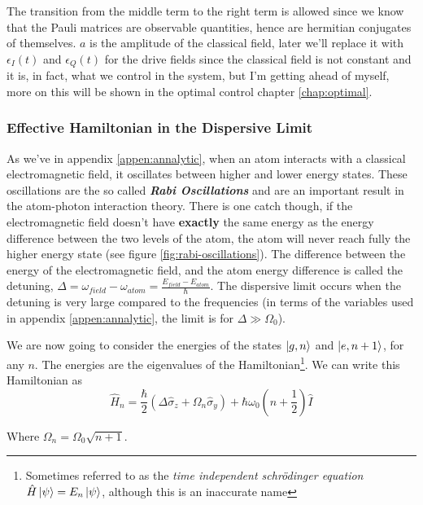 The transition from the middle term to the right term is allowed since we know that the Pauli matrices are observable quantities, hence are hermitian conjugates of themselves. $a$ is the amplitude of the classical field, later we'll replace it with $\epsilon_I (t)$ and $\epsilon_Q (t)$ for the drive fields since the classical field is not constant and it is, in fact, what we control in the system, but I'm getting ahead of myself, more on this will be shown in the optimal control chapter \ref{chap:optimal}.

\subsubsection{Effective Hamiltonian in the Dispersive Limit} \label{sec:dispersive}
As we've in appendix \ref{appen:annalytic}, when an atom interacts with a classical electromagnetic field, it oscillates between higher and lower energy states. These oscillations are the so called \textbf{\textit{Rabi Oscillations}} and are an important result in the atom-photon interaction theory. There is one catch though, if the electromagnetic field doesn't have \textbf{exactly} the same  energy as the energy difference between the two levels of the atom, the atom will never reach fully the higher energy state (see figure \ref{fig:rabi-oscillations}). The difference between the energy of the electromagnetic field, and  the atom  energy difference is called the detuning, $\Delta = \omega_{field} - \omega_{atom} = \frac{E_{field} - E_{atom}}{\hbar}$. The dispersive limit occurs when the detuning is very large compared  to the frequencies (in terms of the variables used in appendix \ref{appen:annalytic}, the limit is for $\Delta \gg \Omega_0$).

We are now going to consider the energies of the states $\ket{g, n}$ and $\ket{e, n+1}$, for any $n$. The energies are the eigenvalues of the Hamiltonian\footnote{Sometimes referred to as the \textit{time independent schr\"{o}dinger equation} $\hat{H}\ket{\psi} = E_n \ket{\psi}$, although this is an inaccurate name}. We can write this Hamiltonian as
\[
    \hat{H}_n = \frac{\hbar}{2} (\Delta \hat{\sigma}_z + \Omega_n \hat{\sigma}_y) + \hbar \omega_0 (n + \frac{1}{2})\hat{I}
\]

Where $\Omega_n = \Omega_0 \sqrt{n + 1}$.

